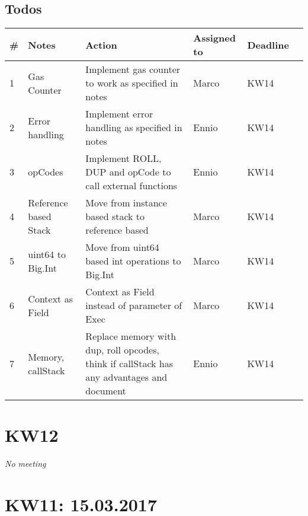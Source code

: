 \subsection{Todos}
\begin{table}[H]
\centering
\begin{tabular} {L{1cm} L{3cm} L{6cm} L{1.5cm} R{1.5cm} R{1cm}}
\toprule
\textbf{\#} & \textbf{Notes}        & \textbf{Action}                                                                           & \textbf{Assigned to} & \textbf{Deadline} \\            & Gas Counter           & Implement gas counter to work as specified in notes                                       & Marco                & KW14              \\
2           & Error handling        & Implement error handling as specified in notes                                            & Ennio                & KW14              \\
3           & opCodes               & Implement ROLL, DUP and opCode to call external functions                                 & Ennio                & KW14              \\
4           & Reference based Stack & Move from instance based stack to reference based                                         & Marco                & KW14              \\
5           & uint64 to Big.Int     & Move from uint64 based int operations to Big.Int                                          & Marco                & KW14              \\
6           & Context as Field      & Context as Field instead of parameter of Exec                                             & Marco                & KW14              \\
7           & Memory, callStack     & Replace memory with dup, roll opcodes, think if callStack has any advantages and document & Ennio                & KW14              \\ \bottomrule
\end{tabular}
\end{table}

\section{KW12}
\textit{No meeting}

\section{KW11: 15.03.2017}
